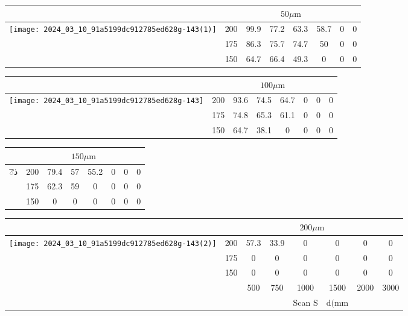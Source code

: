\documentclass[10pt]{article}
\begin{document}
\begin{center}
\begin{tabular}{|c|c|c|c|c|c|c|c|}
\hline
 & \multicolumn{7}{|c|}{$50 \mu \mathrm{m}$} \\
\hline
\multirow{3}{*}{\texttt{[image: 2024\_03\_10\_91a5199dc912785ed628g-143(1)]}
} & 200 & 99.9 & 77.2 & 63.3 & 58.7 & 0 & 0 \\
\hline
 & 175 & 86.3 & 75.7 & 74.7 & 50 & 0 & 0 \\
\hline
 & 150 & 64.7 & 66.4 & 49.3 & 0 & 0 & 0 \\
\hline
\end{tabular}
\end{center}

\begin{center}
\begin{tabular}{|c|c|c|c|c|c|c|c|}
\hline
 & \multicolumn{7}{|c|}{$100 \mu \mathrm{m}$} \\
\hline
\multirow{3}{*}{\texttt{[image: 2024\_03\_10\_91a5199dc912785ed628g-143]}
} & 200 & 93.6 & 74.5 & 64.7 & 0 & 0 & 0 \\
\hline
 & 175 & 74.8 & 65.3 & 61.1 & 0 & 0 & 0 \\
\hline
 & 150 & 64.7 & 38.1 & 0 & 0 & 0 & 0 \\
\hline
\end{tabular}
\end{center}

\begin{center}
\begin{tabular}{|c|c|c|c|c|c|c|c|}
\hline
 & \multicolumn{7}{|c|}{$150 \mu \mathrm{m}$} \\
\hline
\multirow{3}{*}{ذె} & 200 & 79.4 & 57 & 55.2 & 0 & 0 & 0 \\
\hline
 & 175 & 62.3 & 59 & 0 & 0 & 0 & 0 \\
\hline
 & 150 & 0 & 0 & 0 & 0 & 0 & 0 \\
\hline
\end{tabular}
\end{center}

\begin{center}
\begin{tabular}{|c|c|c|c|c|c|c|c|}
\hline
 & \multicolumn{7}{|c|}{$200 \mu \mathrm{m}$} \\
\hline
\multirow{3}{*}{\texttt{[image: 2024\_03\_10\_91a5199dc912785ed628g-143(2)]}
} & 200 & 57.3 & 33.9 & 0 & 0 & 0 & 0 \\
\hline
 & 175 & 0 & 0 & 0 & 0 & 0 & 0 \\
\hline
 & 150 & 0 & 0 & 0 & 0 & 0 & 0 \\
\hline
 &  & 500 & 750 & 1000 & 1500 & 2000 & 3000 \\
\hline
 &  &  &  & Scan S & $\mathrm{d}(\mathrm{mm}$ &  &  \\
\hline
\end{tabular}
\end{center}
\end{document}

